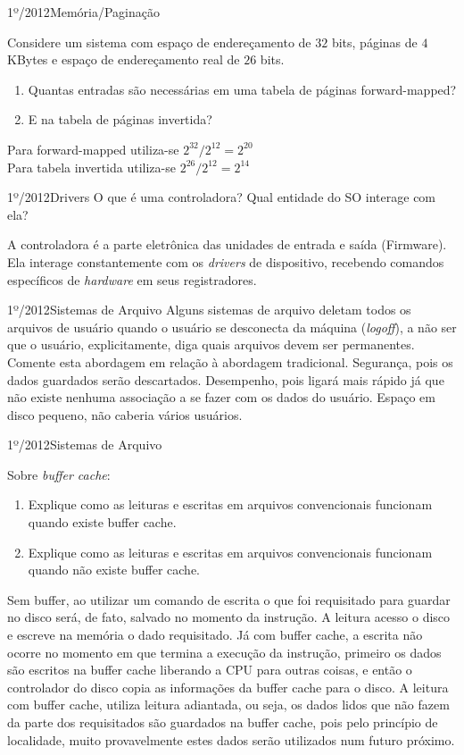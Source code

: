 \begin{exercicio}
  {1º/2012}{Memória/Paginação}
  {Considere um sistema com espaço de endereçamento de $32$ bits, páginas de $4$ KBytes e espaço de endereçamento real de $26$ bits.
  \begin{enumerate}[label=(\alph*)]
    \item Quantas entradas são necessárias em uma tabela de páginas forward-mapped?
    \item E na tabela de páginas invertida?
  \end{enumerate}}
  Para forward-mapped utiliza-se $2^{32}/2^{12} = 2^{20}$ \\
  Para tabela invertida utiliza-se $2^{26}/2^{12} = 2^{14}$
\end{exercicio}

\begin{exercicio}
  {1º/2012}{Drivers}
  {O que é uma controladora? Qual entidade do SO interage com ela?}

  A controladora é a parte eletrônica das unidades de entrada e saída (Firmware). Ela interage constantemente com os \textit{drivers} de dispositivo, recebendo comandos específicos de \textit{hardware} em seus registradores.
\end{exercicio}

\begin{exercicio}
  {1º/2012}{Sistemas de Arquivo}
  {Alguns sistemas de arquivo deletam todos os arquivos de usuário quando o usuário se desconecta da máquina (\textit{logoff}), a não ser que o usuário, explicitamente, diga quais arquivos devem ser permanentes. Comente esta abordagem em relação à abordagem tradicional.}
  Segurança, pois os dados guardados serão descartados.
  Desempenho, pois ligará mais rápido já que não existe nenhuma associação a se fazer com os dados do usuário.
  Espaço em disco pequeno, não caberia vários usuários.
\end{exercicio}

\begin{exercicio}
  {1º/2012}{Sistemas de Arquivo}
  {Sobre \textit{buffer cache}:
  \begin{enumerate}[label=(\alph*)]
    \item Explique como as leituras e escritas em arquivos convencionais funcionam quando existe buffer cache.
    \item Explique como as leituras e escritas em arquivos convencionais funcionam quando não existe buffer cache.
  \end{enumerate}}
  Sem buffer, ao utilizar um comando de escrita o que foi requisitado para guardar no disco será, de fato, salvado no momento da instrução. A leitura acesso o disco e escreve na memória o dado requisitado.
  Já com buffer cache, a escrita não ocorre no momento em que termina a execução da instrução, primeiro os dados são escritos na buffer cache liberando a CPU para outras coisas, e então o controlador do disco copia as informações da buffer cache para o disco.
  A leitura com buffer cache, utiliza leitura adiantada, ou seja, os dados lidos que não fazem da parte dos requisitados são guardados na buffer cache, pois pelo princípio de localidade, muito provavelmente estes dados serão utilizados num futuro próximo.
\end{exercicio}

